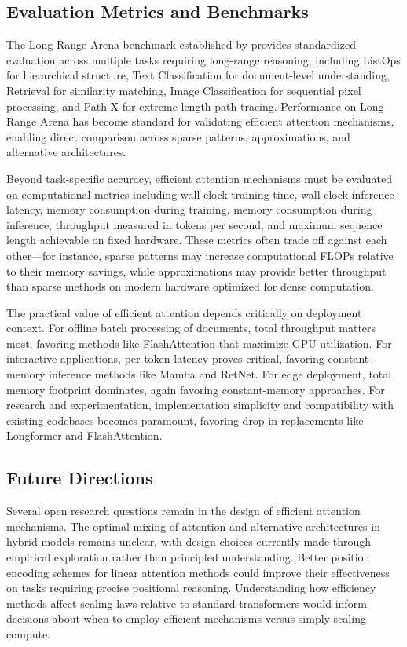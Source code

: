 \subsection{Evaluation Metrics and Benchmarks}

The Long Range Arena benchmark established by \citet{tay2021long} provides standardized evaluation across multiple tasks requiring long-range reasoning, including ListOps for hierarchical structure, Text Classification for document-level understanding, Retrieval for similarity matching, Image Classification for sequential pixel processing, and Path-X for extreme-length path tracing. Performance on Long Range Arena has become standard for validating efficient attention mechanisms, enabling direct comparison across sparse patterns, approximations, and alternative architectures.

Beyond task-specific accuracy, efficient attention mechanisms must be evaluated on computational metrics including wall-clock training time, wall-clock inference latency, memory consumption during training, memory consumption during inference, throughput measured in tokens per second, and maximum sequence length achievable on fixed hardware. These metrics often trade off against each other—for instance, sparse patterns may increase computational FLOPs relative to their memory savings, while approximations may provide better throughput than sparse methods on modern hardware optimized for dense computation.

The practical value of efficient attention depends critically on deployment context. For offline batch processing of documents, total throughput matters most, favoring methods like FlashAttention that maximize GPU utilization. For interactive applications, per-token latency proves critical, favoring constant-memory inference methods like Mamba and RetNet. For edge deployment, total memory footprint dominates, again favoring constant-memory approaches. For research and experimentation, implementation simplicity and compatibility with existing codebases becomes paramount, favoring drop-in replacements like Longformer and FlashAttention.

\subsection{Future Directions}

Several open research questions remain in the design of efficient attention mechanisms. The optimal mixing of attention and alternative architectures in hybrid models remains unclear, with design choices currently made through empirical exploration rather than principled understanding. Better position encoding schemes for linear attention methods could improve their effectiveness on tasks requiring precise positional reasoning. Understanding how efficiency methods affect scaling laws relative to standard transformers would inform decisions about when to employ efficient mechanisms versus simply scaling compute.


